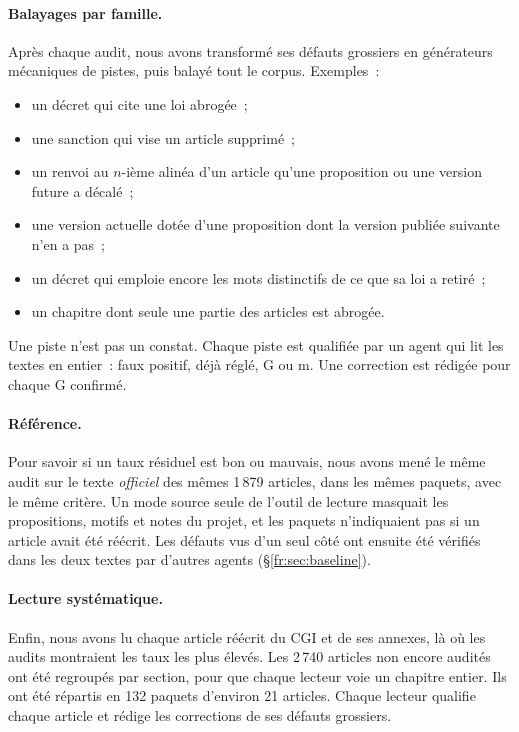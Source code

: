 \documentclass[11pt,a4paper]{article}
\begin{document}
\paragraph{Balayages par famille.}
Après chaque audit, nous avons transformé ses défauts grossiers en générateurs mécaniques de pistes, puis balayé tout le corpus. Exemples~:
\begin{itemize}
  \item un décret qui cite une loi abrogée~;
  \item une sanction qui vise un article supprimé~;
  \item un renvoi au $n$-ième alinéa d'un article qu'une proposition ou une version future a décalé~;
  \item une version actuelle dotée d'une proposition dont la version publiée suivante n'en a pas~;
  \item un décret qui emploie encore les mots distinctifs de ce que sa loi a retiré~;
  \item un chapitre dont seule une partie des articles est abrogée.
\end{itemize}
Une piste n'est pas un constat. Chaque piste est qualifiée par un agent qui lit les textes en entier~: faux positif, déjà réglé, G ou m. Une correction est rédigée pour chaque G confirmé.

\paragraph{Référence.}
Pour savoir si un taux résiduel est bon ou mauvais, nous avons mené le même audit sur le texte \emph{officiel} des mêmes 1\,879 articles, dans les mêmes paquets, avec le même critère. Un mode \og source seule \fg{} de l'outil de lecture masquait les propositions, motifs et notes du projet, et les paquets n'indiquaient pas si un article avait été réécrit. Les défauts vus d'un seul côté ont ensuite été vérifiés dans les deux textes par d'autres agents (\S\ref{fr:sec:baseline}).

\paragraph{Lecture systématique.}
Enfin, nous avons lu chaque article réécrit du CGI et de ses annexes, là où les audits montraient les taux les plus élevés. Les 2\,740 articles non encore audités ont été regroupés par section, pour que chaque lecteur voie un chapitre entier. Ils ont été répartis en 132 paquets d'environ 21 articles. Chaque lecteur qualifie chaque article et rédige les corrections de ses défauts grossiers.
\end{document}
